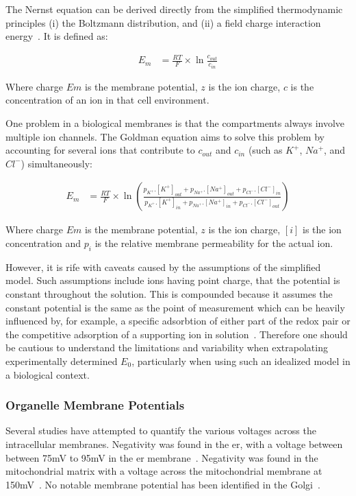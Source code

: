 The Nernst equation can be derived directly from the simplified thermodynamic principles (i) the Boltzmann distribution, and (ii) a field charge interaction energy~\cite{Feiner1994}. It is defined as:

\begin{align*}
{E}_{m} &= \frac{RT}{F}\times \ln { \frac{{c}_{out}}{{c}_{in}} }
\end{align*}

Where charge $Em$ is the membrane potential, $z$ is the ion charge, $c$ is the concentration of an ion in that cell environment.

One problem in a biological membranes is that the compartments always  involve multiple ion channels. The Goldman equation aims to solve this problem by accounting for several ions that contribute to $c_{out}$ and $c_{in}$ (such as $K^+$, $Na^+$, and $Cl^-$) simultaneously:

\begin{align*}
{E}_{m} &= \frac{RT}{F}\times \ln \left(\frac{p_{K^+}.[K^+]_{out} + p_{Na^+}.[Na^+]_{out} + p_{Cl^-}.[Cl^-]_{in}} {p_{K^+}.[K^+]_{in} + p_{Na^+}.[Na^+]_{in} + p_{Cl^-}.[Cl^-]_{out}}\right)
\end{align*}

Where charge $Em$ is the membrane potential, $z$ is the ion charge, $[i]$ is the ion concentration and $p_i$ is the relative membrane permeability for the actual ion.

However, it is rife with caveats caused by the assumptions of the simplified model. Such assumptions include ions having point charge, that the potential is constant throughout the solution. This is compounded because it assumes the constant potential is the same as the point of measurement which can be heavily influenced by, for example, a specific adsorbtion of either part of the redox pair or the competitive adsorption of a supporting ion in solution~\cite{Feiner1994}. Therefore one should be cautious to understand the limitations and variability when extrapolating experimentally determined ${E}_{0}$, particularly when using such an idealized model in a biological context.

\subsubsection{Organelle Membrane Potentials}

Several studies have attempted to quantify the various voltages across the intracellular membranes. Negativity was found in the \gls{er}, with a voltage between between 75mV to 95mV in the \gls{er} membrane~\cite{Qin2011, Worley1994}. Negativity was found in the mitochondrial matrix with a  voltage across the mitochondrial membrane at 150mV~\cite{Perry2011}. No notable membrane potential has been identified in the Golgi~\cite{Schapiro2000, Llopis1998}.

